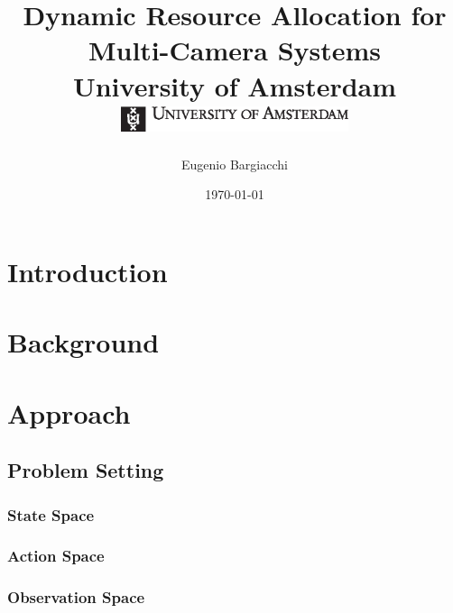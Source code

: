 \documentclass[10pt,twoside]{report}
\title{
    {Dynamic Resource Allocation for Multi-Camera Systems}\\
    {University of Amsterdam}\\\vspace{1cm}
    {\includegraphics[width=0.5\textwidth]{UvA-logo}}
}
\author{Eugenio Bargiacchi}
\date{\today}
\begin{document}
\maketitle


\tableofcontents

\chapter{Introduction}\label{ref:intro}


\chapter{Background}\label{ref:background}



\chapter{Approach}\label{ref:approach}

    \section{Problem Setting}
        \subsection{State Space}
        \subsection{Action Space}
        \subsection{Observation Space}
\end{document}
